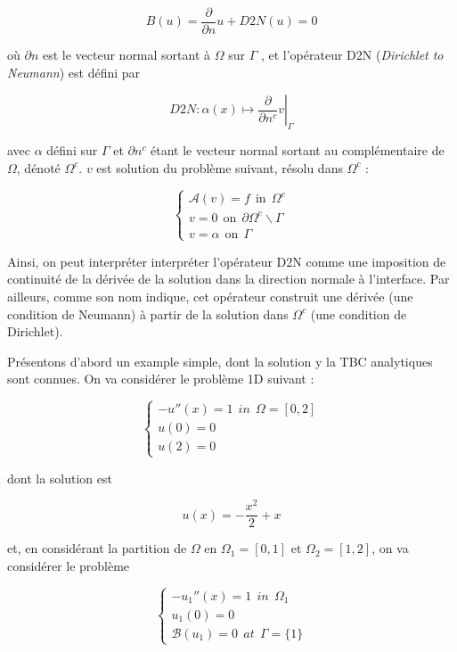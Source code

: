 \begin{equation}
\label{eq:exactTBC}
B(u) = \frac{\partial}{\partial n}u + D2N(u) = 0
\end{equation}

\noindent où $\partial n$ est le vecteur normal sortant à $\Omega$ sur $\Gamma$ , et l'opérateur D2N (\emph{Dirichlet to Neumann}) est défini par

$$\left. D2N : \alpha(x) \mapsto \frac{\partial}{\partial n^c}v \right\rvert_{\Gamma}$$

\noindent avec $\alpha$ défini sur $\Gamma$ et $\partial n^c$ étant le vecteur normal sortant au complémentaire de $\Omega$, dénoté $\Omega^c$. $v$ est solution du problème suivant, résolu dans $\Omega^c$ : 

\begin{equation*}
\begin{cases}
\mathcal{A}(v) = f \ \ \text{in} \ \ \Omega^c\\
v = 0 \ \ \text{on} \ \ \partial \Omega^c \backslash \Gamma \\
v = \alpha \ \ \text{on} \ \ \Gamma
\end{cases}
\end{equation*}

\indent Ainsi, on peut interpréter interpréter l'opérateur D2N comme une imposition de continuité de la dérivée de la solution dans la direction normale à l'interface. Par ailleurs, comme son nom indique, cet opérateur construit une dérivée (une condition de Neumann) à partir de la solution dans $\Omega^c$ (une condition de Dirichlet).



\indent Présentons d'abord un example simple, dont la solution y la TBC analytiques sont connues. On va considérer le problème 1D suivant :

\begin{equation*}
\begin{cases}
-u''(x) = 1 \ \ in \ \ \Omega = [0,2]\\
u(0) = 0 \\
u(2) = 0
\end{cases}
\end{equation*}

\noindent dont la solution est

$$u(x) = -\frac{x^2}{2} + x$$

\noindent et, en considérant la partition de $\Omega$ en $\Omega_1 = [0,1]$ et $\Omega_2 = [1,2]$, on va considérer le problème

\begin{equation*}
\begin{cases}
-u_1''(x) = 1 \ \ in \ \ \Omega_1\\
u_1(0) = 0 \\
\mathcal{B}(u_1) = 0 \ \ at \ \ \Gamma=\{1\}
\end{cases}
\end{equation*}

